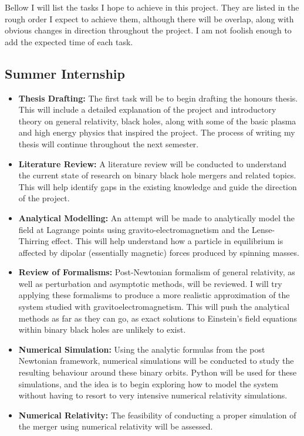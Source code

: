 Bellow I will list the tasks I hope to achieve in this project. They are listed in the rough order I expect to achieve them, although there will be overlap, along with obvious changes in direction throughout the project. I am not foolish enough to add the expected time of each task.

\subsection{Summer Internship}

\begin{itemize}
    \item \textbf{Thesis Drafting:} The first task will be to begin drafting the honours thesis. This will include a detailed explanation of the project and introductory theory on general relativity, black holes, along with some of the basic plasma and high energy physics that inspired the project. The process of writing my thesis will continue throughout the next semester.
    
    \item \textbf{Literature Review:} A literature review will be conducted to understand the current state of research on binary black hole mergers and related topics. This will help identify gaps in the existing knowledge and guide the direction of the project.
    
    \item \textbf{Analytical Modelling:} An attempt will be made to analytically model the field at Lagrange points using gravito-electromagnetism and the Lense-Thirring effect. This will help understand how a particle in equilibrium is affected by dipolar (essentially magnetic) forces produced by spinning masses.
    
    \item \textbf{Review of Formalisms:} Post-Newtonian formalism of general relativity, as well as perturbation and asymptotic methods, will be reviewed. I will try applying these formalisms to produce a more realistic approximation of the system studied with gravitoelectromagnetism. This will push the analytical methods as far as they can go, as exact solutions to Einstein's field equations within binary black holes are unlikely to exist.
    
    \item \textbf{Numerical Simulation:} Using the analytic formulas from the post Newtonian framework, numerical simulations will be conducted to study the resulting behaviour around these binary orbits. Python will be used for these simulations, and the idea is to begin exploring how to model the system  without having to resort to very intensive numerical relativity simulations.
    
    \item \textbf{Numerical Relativity:} The feasibility of conducting a proper simulation of the merger using numerical relativity will be assessed.
\end{itemize}


